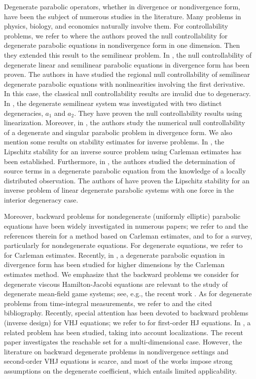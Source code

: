 \documentclass[reqno]{amsart}
\theoremstyle{plain}
\theoremstyle{remark}
\numberwithin{equation}{section}
\begin{document}
Degenerate parabolic operators, whether in divergence or nondivergence form, have been the subject of numerous studies in the literature. Many problems in physics, biology, and economics naturally involve them. For controllability problems, we refer to \cite{CFR08} where the authors proved the null controllability for degenerate parabolic equations in nondivergence form in one dimension. Then they extended this result to the semilinear problem. In \cite{Alab2006}, the null controllability of degenerate linear and semilinear parabolic equations in divergence form has been proven. The authors in \cite{CR06} have studied the regional null controllability of semilinear degenerate parabolic equations with nonlinearities involving the first derivative. In this case, the classical null controllability results are invalid due to degeneracy. In \cite{Ait11}, the degenerate semilinear system was investigated with two distinct degeneracies, $a_1$ and $a_2$. They have proven the null controllability results using linearization. Moreover, in \cite{Atifi17}, the authors study the numerical null controllability of a degenerate and singular parabolic problem in divergence form. We also mention some results on stability estimates for inverse problems. In \cite{CR10}, the Lipschitz stability for an inverse source problem using Carleman estimates has been established. Furthermore, in \cite{Tort10}, the authors studied the determination of source terms in a degenerate parabolic equation from the knowledge of a locally distributed observation. The authors of \cite{BOUTAA14} have proven the Lipschitz stability for an inverse problem of linear degenerate parabolic systems with one force in the interior degeneracy case.

Moreover, backward problems for nondegenerate (uniformly elliptic) parabolic equations have been widely investigated in numerous papers; we refer to \cite{Kl06} and the references therein for a method based on Carleman estimates, and to \cite{Ya} for a survey, particularly for nondegenerate equations. For degenerate equations, we refer to \cite{Ka15} for Carleman estimates. Recently, in \cite{CY23}, a degenerate parabolic equation in divergence form has been studied for higher dimensions by the Carleman estimates method. We emphasize that the backward problems we consider for degenerate viscous Hamilton-Jacobi equations are relevant to the study of degenerate mean-field game systems; see, e.g., the recent work \cite{CHJMR25}. As for degenerate problems from time-integral measurements, we refer to \cite{Kam20} and the cited bibliography. Recently, special attention has been devoted to backward problems (inverse design) for VHJ equations; we refer to \cite{EZ20, CP20} for first-order HJ equations. In \cite{CP24}, a related problem has been studied, taking into account localizations. The recent paper \cite{EZ23} investigates the reachable set for a multi-dimensional case. However, the literature on backward degenerate problems in nondivergence settings and second-order VHJ equations is scarce, and most of the works impose strong assumptions on the degenerate coefficient, which entails limited applicability.
\end{document}
